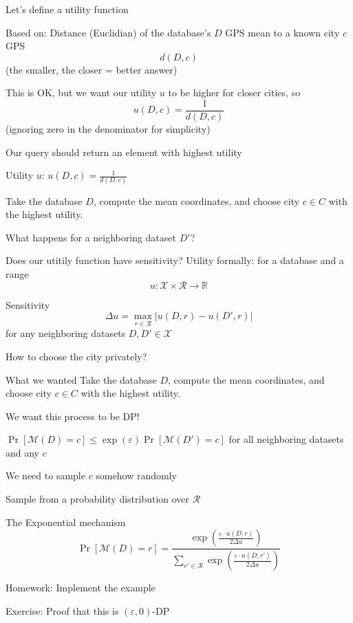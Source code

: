 \documentclass[12pt,aspectratio=169,handout]{beamer}
\begin{document}
\begin{frame}{Let's define a utility function}

Based on: Distance (Euclidian) of the database's $D$ GPS mean to a known city $c$ GPS
$$d(D, c)$$
(the smaller, the closer = better answer)

This is OK, but we want our utility $u$ to be higher for closer cities, so
$$
u(D, c) = \frac{1}{d(D, c)}
$$
(ignoring zero in the denominator for simplicity)

\end{frame}


\begin{frame}{Our query should return an element with highest utility}

Utility $u$: $u(D, c) = \frac{1}{d(D, c)}$

Take the database $D$, compute the mean coordinates, and choose city $c \in C$ with the highest utility.

What happens for a neighboring dataset $D'$?
\end{frame}


\begin{frame}{Does our utitily function have sensitivity?}
Utility formally: for a database and a range
$$
u: \mathcal{X} \times \mathcal{R} \to \mathbb{R}
$$

Sensitivity
$$
\Delta u = \max_{r \in \mathcal{R}} |u(D, r) - u(D', r)|
$$
for any neighboring datasets $D, D' \in \mathcal{X}$
\end{frame}

\begin{frame}{How to choose the city privately?}

\begin{block}{What we wanted}
Take the database $D$, compute the mean coordinates, and choose city $c \in C$ with the highest utility.
\end{block}

We want this process to be DP!

$\Pr[\mathcal{M}(D) =c] \leq \exp(\varepsilon) \Pr[\mathcal{M}(D') = c]$ for all neighboring datasets and any $c$

We need to sample $c$ somehow randomly
\end{frame}


\begin{frame}{Sample from a probability distribution over $\mathcal{R}$}

The Exponential mechanism
$$
\Pr [ \mathcal{M}(D) = r] = \frac{\exp \left( \frac{\varepsilon \cdot u(D, r)}{2 \Delta u} \right)}{\sum_{r' \in \mathcal{R}} \exp \left( \frac{\varepsilon \cdot u(D, r')}{2 \Delta u} \right)}
$$

Homework: Implement the example

Exercise: Proof that this is $(\varepsilon, 0)$-DP

\end{frame}
\end{document}
